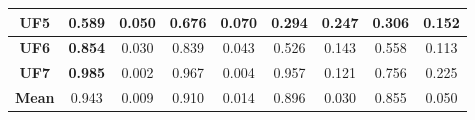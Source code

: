 \begin{table*}[t]
\begin{tabular}{c c|c|c|c|c|c|c|c}
\textbf{UF5}   & 0.589               & 0.050            & \textbf{0.676}    & 0.070           & 0.294              & 0.247           & 0.306              & 0.152            \\ \hline
\textbf{UF6}   & \textbf{0.854}      & 0.030            & 0.839             & 0.043           & 0.526              & 0.143           & 0.558              & 0.113            \\ \hline
\textbf{UF7}   & \textbf{0.985}      & 0.002            & 0.967             & 0.004           & 0.957              & 0.121           & 0.756              & 0.225            \\ \hline
\textbf{Mean}  & 0.943               & 0.009            & 0.910             & 0.014           & 0.896              & 0.030           & 0.855              & 0.050            \\ \hline
\end{tabular}%
\end{table*}

